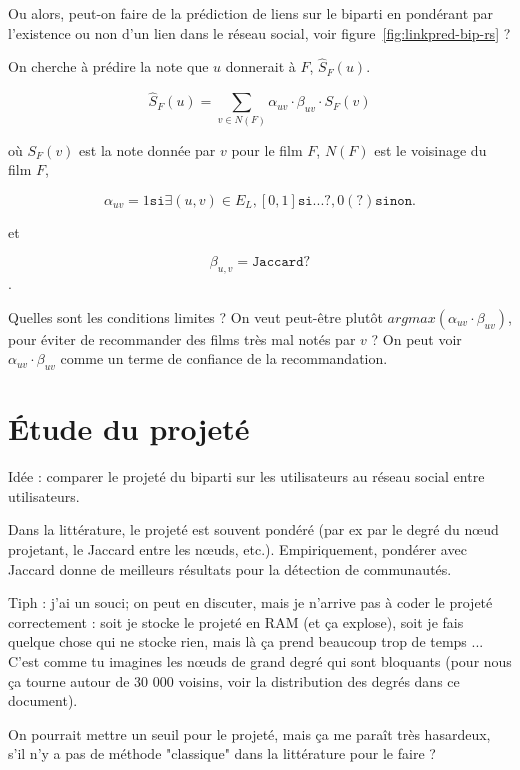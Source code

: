 \documentclass[a4paper, 11pt]{article}
\begin{document}
	Ou alors, peut-on faire de la prédiction de liens sur le biparti en pondérant par l'existence ou non d'un lien dans le réseau social, voir figure~\ref{fig:linkpred-bip-rs} ?
	
	On cherche à prédire la note que $u$ donnerait à $F$, $\hat{S}_F(u)$.
	
	$$
		\hat{S}_F(u) = \sum_{v\in N(F)} \alpha_{uv}\cdot \beta_{uv} \cdot S_F(v)
	$$
	
	où $S_F(v)$ est la note donnée par $v$ pour le film $F$, $N(F)$ est le voisinage du film $F$,
	
	$$
		\alpha_{uv} = 1\mathtt{ si }\exists (u,v)\in E_L, [0,1] \mathtt{ si ... ?,} 0\mathtt{ (?) sinon.}
	$$
	
	et
	
	$$
	\beta_{u,v} = \mathtt{Jaccard ?}
	$$.
	
	
	Quelles sont les conditions limites ? On veut peut-être plutôt $argmax(\alpha_{uv}\cdot\beta_{uv})$, pour éviter de recommander des films très mal notés par $v$ ? On peut voir $\alpha_{uv}\cdot\beta_{uv}$ comme un terme de confiance de la recommandation.
	
	
	\section{Étude du projeté}
	
	Idée : comparer le projeté du biparti sur les utilisateurs au réseau social entre utilisateurs. 
	
	Dans la littérature, le projeté est souvent pondéré (par ex par le degré du n\oe{}ud projetant, le Jaccard entre les n\oe{}uds, etc.). Empiriquement, pondérer avec Jaccard donne de meilleurs résultats pour la détection de communautés.
	
	Tiph : j'ai un souci; on peut en discuter, mais je n'arrive pas à coder le projeté correctement : soit je stocke le projeté en RAM (et ça explose), soit je fais quelque chose qui ne stocke rien, mais là ça prend beaucoup trop de temps ... C'est comme tu imagines les n\oe{}uds de grand degré qui sont bloquants (pour nous ça tourne autour de 30 000 voisins, voir la distribution des degrés dans ce document).
	
	On pourrait mettre un seuil pour le projeté, mais ça me paraît très hasardeux, s'il n'y a pas de méthode "classique" dans la littérature pour le faire ?
	
	
	
\end{document}
